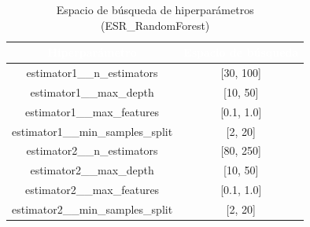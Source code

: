 \begin{table}[htp]
	\centering
	\renewcommand{\arraystretch}{1.3}
		\begin{tabular}{ | c | c | }
			\hline
			\rowcolor[HTML]{5B9BD5} 
			\textcolor{white}{\textbf{Hiperparámetro}} & \textcolor{white}{\textbf{Espacio de búsqueda}}\\
			\hline
			
			estimator1\_\_n\_estimators & [30, 100] \\
			\hline
			estimator1\_\_max\_depth & [10, 50] \\
			\hline
			estimator1\_\_max\_features & [0.1, 1.0] \\
			\hline
			estimator1\_\_min\_samples\_split & [2, 20] \\
			\hline
			estimator2\_\_n\_estimators & [80, 250] \\
			\hline
			estimator2\_\_max\_depth & [10, 50] \\
			\hline
			estimator2\_\_max\_features & [0.1, 1.0] \\
			\hline
			estimator2\_\_min\_samples\_split & [2, 20] \\
			\hline
			
		\end{tabular} 
		
		\caption{Espacio de búsqueda de hiperparámetros (ESR\_RandomForest)}
		\label{table:esr_rf_hiperparam}
	\end{table}